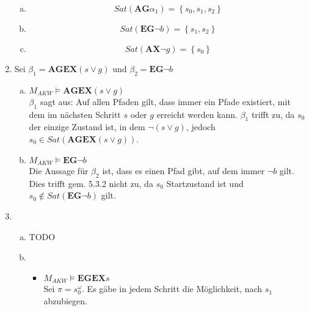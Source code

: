 \documentclass[a4paper]{scrartcl}
\begin{document}
\begin{enumerate}
\begin{enumerate}[(a)]
            \item
                \begin{equation}
                    Sat(\textbf{AG}\alpha_1) = \left\{ s_0, s_1, s_2 \right\}
                \end{equation}

            \item
                \begin{equation}
                    Sat(\textbf{EG} \lnot b) = \left\{ s_1, s_2 \right\}
                \end{equation}

            \item
                \begin{equation}
                    Sat(\textbf{AX} \lnot g) = \left\{ s_0 \right\}
                \end{equation}

        \end{enumerate}

    \item Sei $\beta_1=\textbf{AGEX}(s\vee g)$ und $\beta_2=\textbf{EG}\neg b$
        \begin{enumerate}[(a)]
            \item $M_{AKW}\models\textbf{AGEX}(s\vee g)$ \\
                $\beta_1$ sagt aus: Auf allen Pfaden gilt, dass immer ein Pfade
                existiert, mit dem im nächsten Schritt $s$ oder $g$ erreicht
                werden kann.
                $\beta_1$ trifft zu, da $s_0$ der einzige Zustand ist, in dem
                $\neg(s\vee g)$, jedoch $s_0\in Sat(\textbf{AGEX}(s\vee g))$.

            \item $M_{AKW}\models\textbf{EG}\neg b$ \\
                Die Aussage für $\beta_2$ ist, dass es einen Pfad gibt, auf dem
                immer $\neg b$ gilt.
                Dies trifft gem. 5.3.2 nicht zu, da $s_0$ Startzustand ist und
                $s_0\notin Sat(\textbf{EG}\neg b)$ gilt.

        \end{enumerate}

    \item
        \begin{enumerate}[(a)]
            \item TODO
                
            \item
                \begin{itemize}
                    \item $M_{AKW} \models \textbf{EGEX}s$ \\
                        Sei $\pi = s_0^\omega$.
                        Es gäbe in jedem Schritt die Möglichkeit, nach $s_1$
                        abzubiegen.


\end{itemize}
\end{enumerate}
\end{enumerate}
\end{document}
